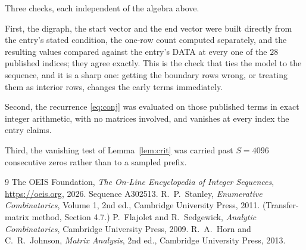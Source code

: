\documentclass[11pt,a4paper]{article}
\theoremstyle{plain}
\theoremstyle{definition}
\begin{document}
Three checks, each independent of the algebra above.

First, the digraph, the start vector and the end vector were built directly from the
entry's stated condition, the one-row count computed separately, and the resulting values
compared against the entry's DATA at every one of the $28$ published indices; they
agree exactly. This is the check that ties the model to the sequence, and it is a sharp one:
getting the boundary rows wrong, or treating them as interior rows, changes the early terms
immediately.

Second, the recurrence \eqref{eq:conj} was evaluated on those published terms in exact
integer arithmetic, with no matrices involved, and vanishes at every index the entry claims.

Third, the vanishing test of Lemma~\ref{lem:crit} was carried past $S=4096$ consecutive
zeros rather than to a sampled prefix.

\begin{thebibliography}{9}
 The OEIS Foundation, \emph{The On-Line Encyclopedia of Integer
Sequences}, \url{https://oeis.org}, 2026. Sequence A302513.
 R.~P.~Stanley, \emph{Enumerative Combinatorics}, Volume 1, 2nd ed.,
Cambridge University Press, 2011. (Transfer-matrix method, Section 4.7.)
 P.~Flajolet and R.~Sedgewick, \emph{Analytic Combinatorics}, Cambridge
University Press, 2009.
 R.~A.~Horn and C.~R.~Johnson, \emph{Matrix Analysis}, 2nd ed., Cambridge
University Press, 2013.
\end{thebibliography}
\end{document}

